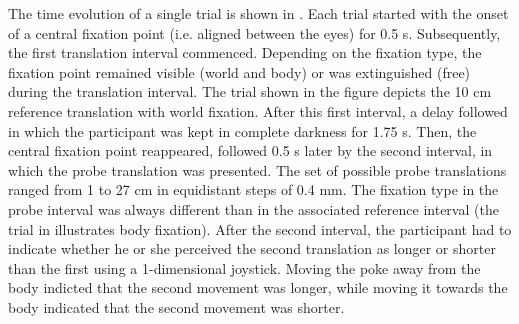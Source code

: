 The time evolution of a single trial is shown in . Each trial started with the onset of a central fixation point (i.e. aligned between the eyes) for 0.5 \si{\second}. Subsequently, the first translation interval commenced.  Depending on the fixation type, the fixation point remained visible (world and body) or was extinguished (free) during the translation interval. The trial shown in the figure depicts the 10 \si{\centi\metre} reference translation with world fixation. After this first interval, a delay followed in which the participant was kept in complete darkness for 1.75 \si{\second}. Then, the central fixation point reappeared, followed 0.5 \si{\second} later by the second interval, in which the probe translation was presented. The set of possible probe translations ranged from 1 to 27 \si{\centi\metre} in equidistant steps of 0.4 \si{\milli\metre}. The fixation type in the probe interval was always different than in the associated reference interval (the trial in  illustrates body fixation). After the second interval, the participant had to indicate whether he or she perceived the second translation as longer or shorter than the first using a 1-dimensional joystick. Moving the poke away from the body indicted that the second movement was longer, while moving it towards the body indicated that the second movement was shorter.


